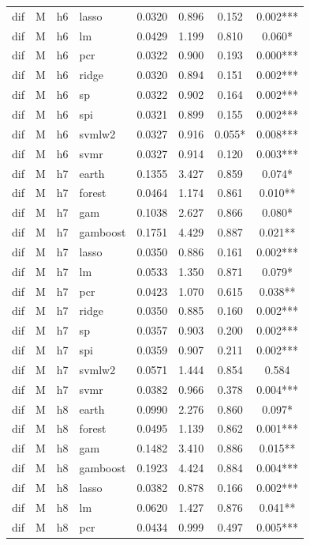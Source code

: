 \begin{ThreePartTable}
\begin{longtable}[t]{llclcccc}
dif & M & h6 & lasso & 0.0320 & 0.896 & 0.152 & 0.002***\\
dif & M & h6 & lm & 0.0429 & 1.199 & 0.810 & 0.060*\\
dif & M & h6 & pcr & 0.0322 & 0.900 & 0.193 & 0.000***\\
dif & M & h6 & ridge & 0.0320 & 0.894 & 0.151 & 0.002***\\
dif & M & h6 & sp & 0.0322 & 0.902 & 0.164 & 0.002***\\
dif & M & h6 & spi & 0.0321 & 0.899 & 0.155 & 0.002***\\
dif & M & h6 & svmlw2 & 0.0327 & 0.916 & 0.055* & 0.008***\\
dif & M & h6 & svmr & 0.0327 & 0.914 & 0.120 & 0.003***\\
\addlinespace
dif & M & h7 & earth & 0.1355 & 3.427 & 0.859 & 0.074*\\
dif & M & h7 & forest & 0.0464 & 1.174 & 0.861 & 0.010**\\
dif & M & h7 & gam & 0.1038 & 2.627 & 0.866 & 0.080*\\
dif & M & h7 & gamboost & 0.1751 & 4.429 & 0.887 & 0.021**\\
dif & M & h7 & lasso & 0.0350 & 0.886 & 0.161 & 0.002***\\
dif & M & h7 & lm & 0.0533 & 1.350 & 0.871 & 0.079*\\
dif & M & h7 & pcr & 0.0423 & 1.070 & 0.615 & 0.038**\\
dif & M & h7 & ridge & 0.0350 & 0.885 & 0.160 & 0.002***\\
dif & M & h7 & sp & 0.0357 & 0.903 & 0.200 & 0.002***\\
dif & M & h7 & spi & 0.0359 & 0.907 & 0.211 & 0.002***\\
dif & M & h7 & svmlw2 & 0.0571 & 1.444 & 0.854 & 0.584\\
dif & M & h7 & svmr & 0.0382 & 0.966 & 0.378 & 0.004***\\
\addlinespace
dif & M & h8 & earth & 0.0990 & 2.276 & 0.860 & 0.097*\\
dif & M & h8 & forest & 0.0495 & 1.139 & 0.862 & 0.001***\\
dif & M & h8 & gam & 0.1482 & 3.410 & 0.886 & 0.015**\\
dif & M & h8 & gamboost & 0.1923 & 4.424 & 0.884 & 0.004***\\
dif & M & h8 & lasso & 0.0382 & 0.878 & 0.166 & 0.002***\\
dif & M & h8 & lm & 0.0620 & 1.427 & 0.876 & 0.041**\\
dif & M & h8 & pcr & 0.0434 & 0.999 & 0.497 & 0.005***\\

\end{longtable}
\end{ThreePartTable}
